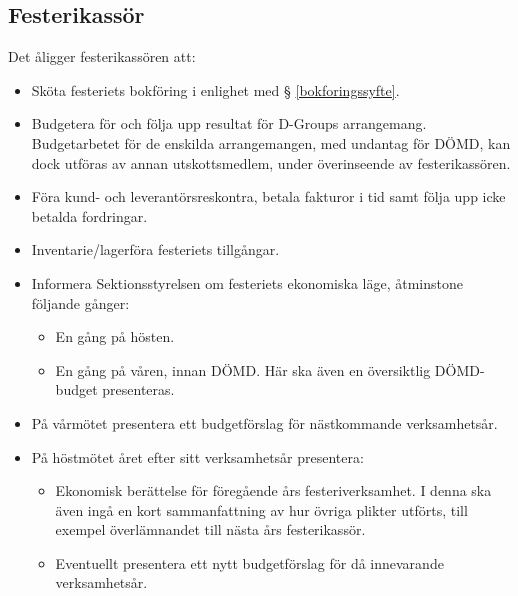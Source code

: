 \documentclass{datateknologsektionen-document}
\begin{document}
\subsection{Festerikassör}
\label{festerikassor}
Det åligger festerikassören att:
\begin{itemize}
  \item Sköta festeriets bokföring i enlighet med § \ref{bokforingssyfte}.
  \item Budgetera för och följa upp resultat för D-Groups arrangemang. Budgetarbetet för de enskilda arrangemangen, med undantag för DÖMD, kan dock utföras av annan utskottsmedlem, under överinseende av festerikassören.
  \item Föra kund- och leverantörsreskontra, betala fakturor i tid samt följa upp icke betalda fordringar.
  \item Inventarie/lagerföra festeriets tillgångar.
  \item Informera Sektionsstyrelsen om festeriets ekonomiska läge, åtminstone följande gånger:
  \begin{itemize}
    \item En gång på hösten.
    \item En gång på våren, innan DÖMD. Här ska även en översiktlig DÖMD-budget presenteras.
  \end{itemize}
  \item På vårmötet presentera ett budgetförslag för nästkommande verksamhetsår.
  \item På höstmötet året efter sitt verksamhetsår presentera:
  \begin{itemize}
    \item Ekonomisk berättelse för föregående års festeriverksamhet. I denna ska även ingå en kort sammanfattning av hur övriga plikter utförts, till exempel överlämnandet till nästa års festerikassör.
    \item Eventuellt presentera ett nytt budgetförslag för då innevarande verksamhetsår.
  \end{itemize}
\end{itemize}
\end{document}
